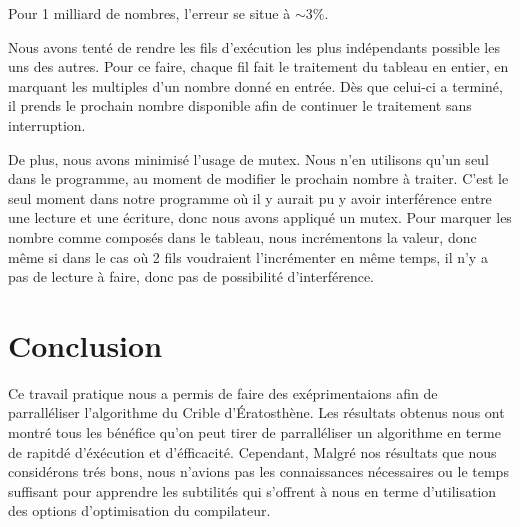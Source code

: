 \documentclass{report}
\begin{document}
	Pour 1 milliard de nombres, l'erreur se situe à $\sim 3\%$.

	\bigskip
	Nous avons tenté de rendre les fils d'exécution les plus indépendants
	possible les uns des autres. Pour ce faire, chaque fil fait le traitement
	du tableau en entier, en marquant les multiples d'un nombre donné en entrée.
	Dès que celui-ci a terminé, il prends le prochain nombre disponible afin de
	continuer le traitement sans interruption.

	\smallskip
	De plus, nous avons minimisé l'usage de mutex. Nous n'en utilisons qu'un seul
	dans le programme, au moment de modifier le prochain nombre à traiter. C'est le
	seul moment dans notre programme où il y aurait pu y avoir interférence entre
	une lecture et une écriture, donc nous avons appliqué un mutex. Pour marquer les
	nombre comme composés dans le tableau, nous incrémentons la valeur, donc même
	si dans le cas où 2 fils voudraient l'incrémenter en même temps, il n'y a pas
	de lecture à faire, donc pas de possibilité d'interférence.

\chapter{Conclusion}
Ce travail pratique nous a permis de faire des exéprimentaions afin de parralléliser l'algorithme du Crible d'Ératosthène.
Les résultats obtenus nous ont montré tous les bénéfice qu'on peut tirer de parralléliser un algorithme en terme de rapitdé
d'éxécution et d'éfficacité.
Cependant, Malgré nos résultats que nous considérons trés bons, nous n'avions pas les connaissances nécessaires ou le temps suffisant
pour apprendre les subtilités qui s'offrent à nous en terme d'utilisation des options d'optimisation du compilateur.
\end{document}
